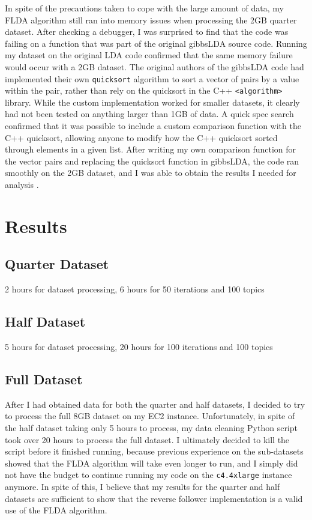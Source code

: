 \documentclass[a4paper]{article}
\begin{document}
In spite of the precautions taken to cope with the large amount of data, my FLDA algorithm still ran into memory issues when processing the 2GB quarter dataset. After checking a debugger, I was surprised to find that the code was failing on a function that was part of the original gibbsLDA source code. Running my dataset on the original LDA code confirmed that the same memory failure would occur with a 2GB dataset. The original authors of the gibbsLDA code had implemented their own \verb+quicksort+ algorithm to sort a vector of pairs by a value within the pair, rather than rely on the quicksort in the C++ \verb+<algorithm>+ library. While the custom implementation worked for smaller datasets, it clearly had not been tested on anything larger than 1GB of data. A quick spec search confirmed that it was possible to include a custom comparison function with the C++ quicksort, allowing anyone to modify how the C++ quicksort sorted through elements in a given list. After writing my own comparison function for the vector pairs and replacing the quicksort function in gibbsLDA, the code ran smoothly on the 2GB dataset, and I was able to obtain the results I needed for analysis \cite{gibbs_lda}.

\section{Results}
\label{sec:results}
\subsection{Quarter Dataset}
2 hours for dataset processing, 6 hours for 50 iterations and 100 topics

\subsection{Half Dataset}
5 hours for dataset processing, 20 hours for 100 iterations and 100 topics

\subsection{Full Dataset}
After I had obtained data for both the quarter and half datasets, I decided to try to process the full 8GB dataset on my EC2 instance. Unfortunately, in spite of the half dataset taking only 5 hours to process, my data cleaning Python script took over 20 hours to process the full dataset. I ultimately decided to kill the script before it finished running, because previous experience on the sub-datasets showed that the FLDA algorithm will take even longer to run, and I simply did not have the budget to continue running my code on the \verb+c4.4xlarge+ instance anymore. In spite of this, I believe that my results for the quarter and half datasets are sufficient to show that the reverse follower implementation is a valid use of the FLDA algorithm.
\end{document}
